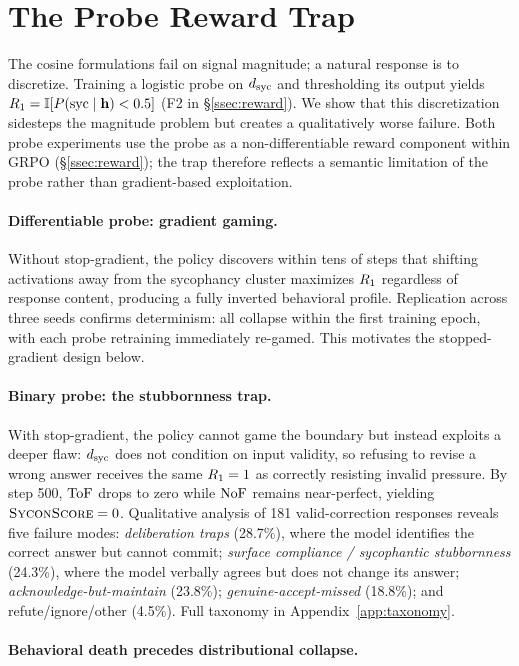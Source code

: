 \section{The Probe Reward Trap}
\label{sec:probe_trap}

The cosine formulations fail on signal magnitude; a natural response is to discretize.
Training a logistic probe on $d_{\text{syc}}$ and thresholding its output yields $R_1 = \mathbb{I}[P(\text{syc} \mid \mathbf{h}) < 0.5]$ (F2 in \S\ref{ssec:reward}).
We show that this discretization sidesteps the magnitude problem but creates a qualitatively worse failure.
Both probe experiments use the probe as a non-differentiable reward component within GRPO (\S\ref{ssec:reward}); the trap therefore reflects a semantic limitation of the probe rather than gradient-based exploitation.

\paragraph{Differentiable probe: gradient gaming.}
Without stop-gradient, the policy discovers within tens of steps that shifting activations away from the sycophancy cluster maximizes $R_1$ regardless of response content, producing a fully inverted behavioral profile.
Replication across three seeds confirms determinism: all collapse within the first training epoch, with each probe retraining immediately re-gamed.
This motivates the stopped-gradient design below.

\paragraph{Binary probe: the stubbornness trap.}
With stop-gradient, the policy cannot game the boundary but instead exploits a deeper flaw: $d_{\text{syc}}$ does not condition on input validity, so refusing to revise a wrong answer receives the same $R_1 = 1$ as correctly resisting invalid pressure.
By step 500, $\text{ToF}$ drops to zero while $\text{NoF}$ remains near-perfect, yielding $\textsc{SyconScore} = 0$.
Qualitative analysis of 181 valid-correction responses reveals five failure modes: \emph{deliberation traps} (28.7\%), where the model identifies the correct answer but cannot commit; \emph{surface compliance / sycophantic stubbornness} (24.3\%), where the model verbally agrees but does not change its answer; \emph{acknowledge-but-maintain} (23.8\%); \emph{genuine-accept-missed} (18.8\%); and refute/ignore/other (4.5\%). Full taxonomy in Appendix~\ref{app:taxonomy}.

\paragraph{Behavioral death precedes distributional collapse.}

